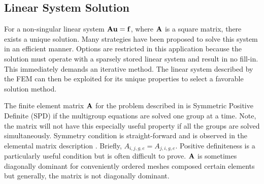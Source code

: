   \subsection{Linear System Solution}
    \label{sec:linear_system_solution}
    For a non-singular linear system $\mathbf{A} \mathbf{u} = \mathbf{f}$, where $\mathbf{A}$ is a square 
    matrix, there exists a unique solution. Many strategies have been proposed 
    to solve this system in an efficient manner. Options are restricted in this
    application because the solution must operate with a sparsely stored linear 
    system and result in no fill-in. This immediately demands an iterative 
    method. The linear system described by the FEM can then be exploited for its 
    unique properties to select a favorable solution method.
    
    The finite element matrix $\mathbf{A}$ for the problem described in 
     is Symmetric Positive Definite (SPD) if the
    multigroup equations are solved one group at a time. Note, the matrix will
    not have this especially useful property if all the groups are solved
    simultaneously. Symmetry condition is straight-forward and is observed in 
    the elemental matrix description . Briefly,
    $A_{i,j,g,e}=A_{j,i,g,e}$.
    Positive definiteness is a particularly useful condition but is often 
    difficult to prove. $\mathbf{A}$ is sometimes diagonally dominant for conveniently
    ordered meshes composed certain elements but generally, the matrix is not 
    diagonally dominant. 
    
